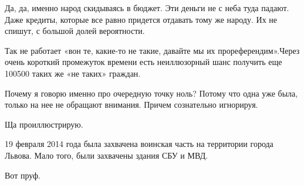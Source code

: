 \begin{multicols}{2}
Да, да, именно народ скидываясь в бюджет. Эти деньги не с неба туда падают.
Даже кредиты, которые все равно придется отдавать тому же народу. Их не спишут,
с большой долей вероятности.

Так не работает «вон те, какие-то не такие, давайте мы их прореферендим».Через
очень короткий промежуток времени есть неиллюзорный шанс получить еще 100500
таких же «не таких» граждан.

Почему я говорю именно про очередную точку ноль? Потому что одна уже была,
только на нее не обращают внимания. Причем сознательно игнорируя.

Ща проиллюстрирую.

19 февраля 2014 года была захвачена воинская часть на территории города Львова.
Мало того, были захвачены здания СБУ и МВД.

Вот пруф.

\end{multicols} %
